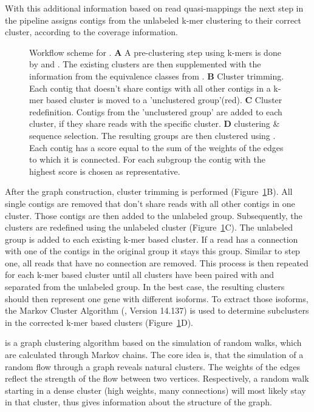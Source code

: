 \documentclass[12pt,a4paper,english]{article}
\begin{document}
	\noindent
	With this additional information based on read quasi-mappings the next step in the pipeline assigns contigs from the unlabeled k-mer clustering to their correct cluster, according to the coverage information.
	
	\begin{figure}[H]
		\centering
		\def\svgwidth{\textwidth}
		
		\caption[Workflow scheme of \karma.]{\label{img:karma_workflow} Workflow scheme for \karma. \textbf{A} A pre-clustering step using k-mers is done by \umap and \hdbscan. The existing clusters are then supplemented with the information from the equivalence classes from \salmon.
			\textbf{B} Cluster trimming. Each contig that doesn't share contigs with all other contigs in a k-mer based cluster is moved to a 'unclustered group'(red).
			\textbf{C} Cluster redefinition. Contigs from the 'unclustered group' are added to each cluster, if they share reads with the specific cluster.
			\textbf{D} \mcl clustering \& sequence selection. The resulting groups are then clustered using \mcl. Each contig has a score equal to the sum of the weights of the edges to which it is connected. For each subgroup the contig with the highest score is chosen as representative.}
	\end{figure} 
	
	After the graph construction, cluster trimming is performed (Figure~\ref{img:karma_workflow}B). All single contigs are removed that don't share reads with all other contigs in one cluster. Those contigs are then added to the unlabeled group.
	Subsequently, the clusters are redefined using the unlabeled cluster (Figure~\ref{img:karma_workflow}C). The unlabeled group is added to each existing k-mer based cluster. If a read has a connection with one of the contigs in the original group it stays this group. Similar to step one, all reads that have no connection are removed. This process is then repeated for each k-mer based cluster until all clusters have been paired with and separated from the unlabeled group.
	In the best case, the resulting clusters should then represent one gene with different isoforms. To extract those isoforms, the Markov Cluster Algorithm (\mcl, Version 14.137) \citep{mcl:00} is used to determine subclusters in the corrected k-mer based clusters (Figure~\ref{img:karma_workflow}D).
	
	\mcl is a graph clustering algorithm based on the simulation of random walks, which are calculated through Markov chains. The core idea is, that the simulation of a random flow through a graph reveals natural clusters. The weights of the edges reflect the strength of the flow between two vertices. Respectively, a random walk starting in a dense cluster (high weights, many connections) will most likely stay in that cluster, thus gives information about the structure of the graph.
	
\end{document}
